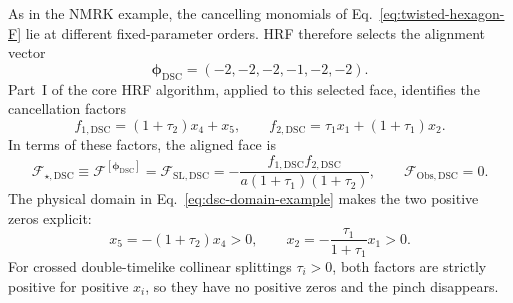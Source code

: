 \documentclass[a4paper,11pt]{article}
\begin{document}
As in the NMRK example, the cancelling monomials of
Eq.~\eqref{eq:twisted-hexagon-F} lie at different fixed-parameter orders.
HRF therefore selects the alignment vector
\begin{equation}
 \boldsymbol\phi_{\mathrm{DSC}}=(-2,-2,-2,-1,-2,-2).
 \label{eq:dsc-alignment-vector}
\end{equation}
Part~I of the core HRF algorithm, applied to this selected face, identifies
the cancellation factors
\begin{equation}
 f_{1,\mathrm{DSC}}=(1+\tau_2)x_4+x_5,\qquad
 f_{2,\mathrm{DSC}}=\tau_1x_1+(1+\tau_1)x_2.
 \label{eq:dsc-factors-example}
\end{equation}
In terms of these factors, the aligned face is
\begin{equation}
 \mathcal F_{\star,\mathrm{DSC}}
 \equiv\mathcal F^{[\boldsymbol\phi_{\mathrm{DSC}}]}
 =\mathcal F_{\mathrm{SL,DSC}}
 =-\frac{f_{1,\mathrm{DSC}}f_{2,\mathrm{DSC}}}
 {a(1+\tau_1)(1+\tau_2)},
 \qquad \mathcal F_{\mathrm{Obs,DSC}}=0.
 \label{eq:dsc-decomposition-example}
\end{equation}
The physical domain in Eq.~\eqref{eq:dsc-domain-example} makes the two
positive zeros explicit:
\begin{equation}
 x_5=-(1+\tau_2)x_4>0,\qquad
 x_2=-\frac{\tau_1}{1+\tau_1}x_1>0.
 \label{eq:dsc-positive-orthant-pinch-example}
\end{equation}
For crossed double-timelike collinear splittings \(\tau_i>0\), both factors
are strictly positive for positive \(x_i\), so they have no positive zeros
and the pinch disappears.
\end{document}
